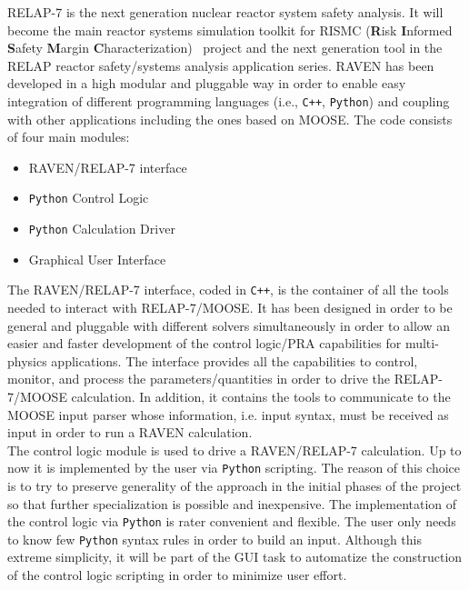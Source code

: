 \documentclass{anstrans}
\begin{document}
RELAP-7 is the next generation nuclear reactor system safety analysis. It will become the main reactor systems simulation toolkit for RISMC (\textbf{R}isk \textbf{I}nformed \textbf{S}afety \textbf{M}argin \textbf{C}haracterization)~\cite{mandelliANS_RISMC} project and the next generation tool in the RELAP reactor safety/systems analysis application series. 
RAVEN has been developed in a high modular and pluggable way in order to enable easy integration of different programming languages (i.e., \verb!C++!, \verb!Python!) and coupling with other applications including the ones based on MOOSE. The code consists of four main modules:
\begin{itemize}
\item RAVEN/RELAP-7 interface
\item \verb!Python! Control Logic 
\item \verb!Python! Calculation Driver
\item Graphical User Interface 
\end{itemize}

The RAVEN/RELAP-7 interface, coded in \verb!C++!, is the container of all the tools needed to interact with RELAP-7/MOOSE. It has been designed in order to be general and pluggable with different solvers simultaneously in order to allow an easier and faster development of the control logic/PRA capabilities for multi-physics applications.
The interface provides all the capabilities to control, monitor, and process the parameters/quantities in order to drive the RELAP-7/MOOSE calculation. In addition, it contains the tools to communicate to the MOOSE input parser whose information, i.e. input syntax, must be received as input in order to run a RAVEN  calculation.\\The control logic module is used to drive a RAVEN/RELAP-7 calculation. Up to now it is implemented by the user via \verb!Python! scripting. The reason of this choice is to try to preserve generality of the approach in the initial phases of the project so that further specialization is possible and  inexpensive. The implementation of the control logic via \verb!Python! is rater convenient and flexible. The user only needs to know few \verb!Python! syntax rules in order to build an input. Although this extreme simplicity, it will be part of the GUI task to automatize the construction of the control logic scripting in order to minimize user effort. 
\end{document}

